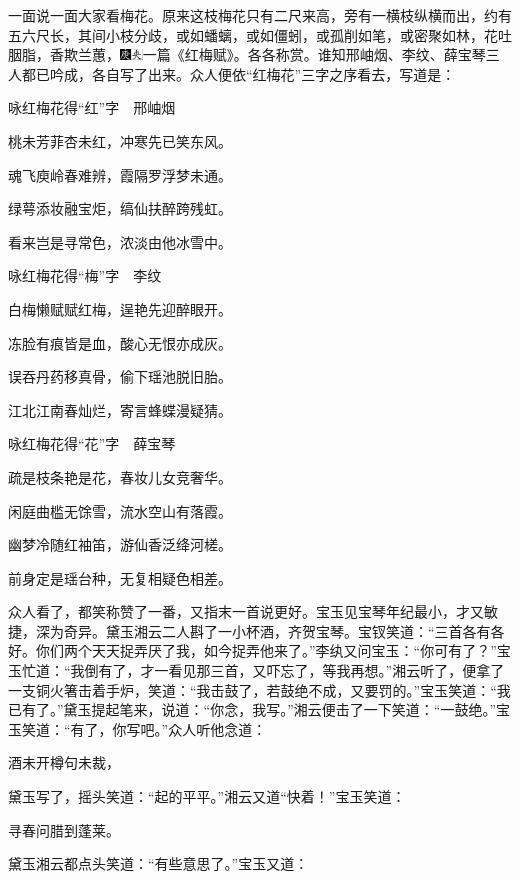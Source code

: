 一面说一面大家看梅花。原来这枝梅花只有二尺来高，旁有一横枝纵横而出，约有五六尺长，其间小枝分歧，或如蟠螭，或如僵蚓，或孤削如笔，或密聚如林，花吐胭脂，香欺兰蕙，{\includegraphics[width=3mm]{../Images/00004}\includegraphics[width=3mm]{../Images/00012}\footnotesize \kaishu 一篇《红梅赋》。}各各称赏。谁知邢岫烟、李纹、薛宝琴三人都已吟成，各自写了出来。众人便依``红梅花''三字之序看去，写道是：

咏红梅花{得``红''字　邢岫烟}

桃未芳菲杏未红，冲寒先已笑东风。

魂飞庾岭春难辨，霞隔罗浮梦未通。

绿萼添妆融宝炬，缟仙扶醉跨残虹。

看来岂是寻常色，浓淡由他冰雪中。

咏红梅花{得``梅''字　李纹}

白梅懒赋赋红梅，逞艳先迎醉眼开。

冻脸有痕皆是血，酸心无恨亦成灰。

误吞丹药移真骨，偷下瑶池脱旧胎。

江北江南春灿烂，寄言蜂蝶漫疑猜。

咏红梅花{得``花''字　薛宝琴}

疏是枝条艳是花，春妆儿女竞奢华。

闲庭曲槛无馀雪，流水空山有落霞。

幽梦冷随红袖笛，游仙香泛绛河槎。

前身定是瑶台种，无复相疑色相差。

众人看了，都笑称赞了一番，又指末一首说更好。宝玉见宝琴年纪最小，才又敏捷，深为奇异。黛玉湘云二人斟了一小杯酒，齐贺宝琴。宝钗笑道：``三首各有各好。你们两个天天捉弄厌了我，如今捉弄他来了。''李纨又问宝玉：``你可有了？''宝玉忙道：``我倒有了，才一看见那三首，又吓忘了，等我再想。''湘云听了，便拿了一支铜火箸击着手炉，笑道：``我击鼓了，若鼓绝不成，又要罚的。''宝玉笑道：``我已有了。''黛玉提起笔来，说道：``你念，我写。''湘云便击了一下笑道：``一鼓绝。''宝玉笑道：``有了，你写吧。''众人听他念道：

酒未开樽句未裁，

黛玉写了，摇头笑道：``起的平平。''湘云又道``快着！''宝玉笑道：

寻春问腊到蓬莱。

黛玉湘云都点头笑道：``有些意思了。''宝玉又道：

